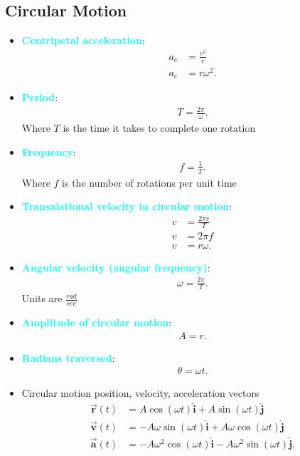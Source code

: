 \documentclass{report}
\begin{document}
    \subsection{Circular Motion}
    \begin{itemize}
                \item \textbf{\textcolor{cyan}{Centripetal acceleration}}:
            \begin{align*}
                a_{c} &= \frac{v^{2}}{r} \\
                a_{c} &= r\omega^{2}
            .\end{align*}
        \item \textbf{\textcolor{cyan}{Period}}:
            \begin{align*}
                T = \frac{2\pi}{\omega}
            .\end{align*}
            Where $T$ is the time it takes to complete one rotation
        \item \textbf{\textcolor{cyan}{Frequency}}:
            \begin{align*}
                f = \frac{1}{T}
            .\end{align*}
            Where $f$ is the number of rotations per unit time
        \item \textbf{\textcolor{cyan}{Transalational velocity in circular motion}}:
            \begin{align*}
                v &= \frac{2\pi r}{T} \\
                v &= 2\pi f \\
                v &= r\omega
            .\end{align*}
        \item \textbf{\textcolor{cyan}{Angular velocity (angular frequency)}}:
            \begin{align*}
                \omega = \frac{2\pi}{T}
            .\end{align*}
            Units are $\frac{rad}{sec}$
        \item \textbf{\textcolor{cyan}{Amplitude of circular motion}}:
            \begin{align*}
                A = r
            .\end{align*}
        \item \textbf{\textcolor{cyan}{Radians traversed}}:
            \begin{align*}
                \theta  = \omega t
            .\end{align*}
        \item {Circular motion position, velocity, acceleration vectors}
            \begin{align*}
                \vec{\mathbf{r}}(t) &= A\cos{\left(\omega t\right)} \hat{\mathbf{i}} + A\sin{\left(\omega t\right)}\hat{\mathbf{j}} \\
                \vec{\mathbf{v}}(t) &= -A\omega\sin{\left(\omega t\right)}\hat{\mathbf{i}} + A\omega \cos{\left(\omega t\right)}\hat{\mathbf{j}} \\
                \vec{\mathbf{a}}(t) &= -A\omega^{2}\cos{\left(\omega t\right)}\hat{\mathbf{i}} - A\omega^{2}\sin{\left(\omega t\right)}\hat{\mathbf{j}}
            .\end{align*}


\end{itemize}
\end{document}
